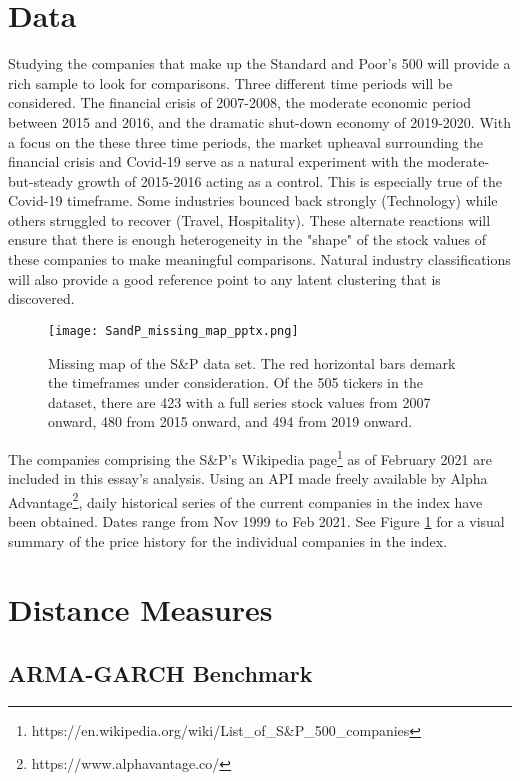 \documentclass[12pt]{article}
\begin{document}
\section{Data}

Studying the companies that make up the Standard and Poor's 500 will provide a rich sample to look for comparisons. Three different time periods will be considered. The financial crisis of 2007-2008, the moderate economic period between 2015 and 2016, and the dramatic shut-down economy of 2019-2020. With a focus on the these three time periods, the market upheaval surrounding the financial crisis and Covid-19 serve as a natural experiment with the moderate-but-steady growth of 2015-2016 acting as a control. This is especially true of the Covid-19 timeframe. Some industries bounced back strongly (Technology) while others struggled to recover (Travel, Hospitality). These alternate reactions will ensure that there is enough heterogeneity in the "shape" of the stock values of these companies to make meaningful comparisons. Natural industry classifications will also provide a good reference point to any latent clustering that is discovered.

\begin{figure}
    \centering
    \texttt{[image: SandP\_missing\_map\_pptx.png]}
    \caption{Missing map of the S\&P data set. The red horizontal bars demark the timeframes under consideration. Of the 505 tickers in the dataset, there are 423 with a full series stock values from 2007 onward, 480 from 2015 onward, and 494 from 2019 onward.}
    \label{fig:SandP_missing_map}
\end{figure}


The companies comprising the S\&P's Wikipedia page\footnote{https://en.wikipedia.org/wiki/List\_of\_S\&P\_500\_companies} as of February 2021 are included in this essay's analysis. Using an API made freely available by Alpha Advantage\footnote{https://www.alphavantage.co/}, daily historical series of the current companies in the index have been obtained. Dates range from Nov 1999 to Feb 2021. See Figure \ref{fig:SandP_missing_map} for a visual summary of the price history for the individual companies in the index.

\section{Distance Measures}

\subsection{ARMA-GARCH Benchmark} \label{sec:ARMAGARCH-benchmark}
\end{document}
